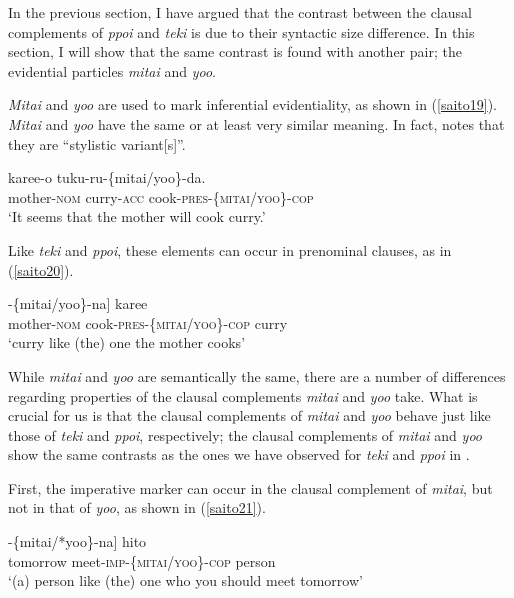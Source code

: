 \documentclass[output=paper]{langscibook}
\begin{document}
In the previous section, I have argued that the contrast between the clausal complements of \emph{ppoi} and \emph{teki} is due to their syntactic size difference. In this section, I will show that the same contrast is found with another pair; the evidential particles \emph{mitai} and \emph{yoo}.

\emph{Mitai} and \emph{yoo} are used to mark inferential evidentiality, as shown in (\ref{saito19}). \emph{Mitai} and \emph{yoo} have the same or at least very similar meaning. In fact, \citet[169]{Narrog2009} notes that they are “stylistic variant[s]”.

\begin{exe}
\ex \label{saito19}
  {karee-o} {tuku-ru-}\{{mitai/yoo}\}-{da.}\\
mother-\textsc{nom} curry-\textsc{acc} cook-\textsc{pres}-\{\textsc{mitai/yoo}\}-\textsc{cop}\\ 
\glt ‘It seems that the mother will cook curry.’
\end{exe}

Like \emph{teki} and \emph{ppoi}, these elements can occur in prenominal clauses, as in (\ref{saito20}).

\begin{exe}
\ex \label{saito20}
\gll [[{okaasan-ga} {tuku-ru}]-\{{mitai/yoo}\}-{na}] {karee}\\
mother-\textsc{nom}  cook-\textsc{pres}-\{\textsc{mitai/yoo}\}-\textsc{cop} curry\\ 
\glt ‘curry like (the) one the mother cooks’
\end{exe}

While \emph{mitai} and \emph{yoo} are semantically the same, there are a number of differences regarding properties of the clausal complements \emph{mitai} and \emph{yoo} take. What is crucial for us is that the clausal complements of \emph{mitai} and \emph{yoo} behave just like those of \emph{teki} and \emph{ppoi}, respectively; the clausal complements of \emph{mitai} and \emph{yoo} show the same contrasts as the ones we have observed for \emph{teki} and \emph{ppoi} in .

First, the imperative marker can occur in the clausal complement of \emph{mitai}, but not in that of \emph{yoo}, as shown in (\ref{saito21}).

\begin{exe}
\ex \label{saito21}
\gll [[{asita} {a-e}]-\{{mitai/*yoo}\}-{na}] {hito}\\
tomorrow meet-\textsc{imp}-\{\textsc{mitai/yoo}\}-\textsc{cop} person\\ 
\glt ‘(a) person like (the) one who you should meet tomorrow’
\end{exe}
\end{document}
